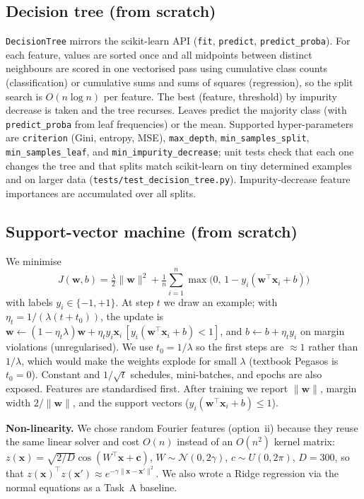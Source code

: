 \documentclass[10pt,twocolumn,a4paper]{article}
\begin{document}
\subsection{Decision tree (from scratch)}
\texttt{DecisionTree} mirrors the scikit-learn API (\texttt{fit}, \texttt{predict},
\texttt{predict\_proba}). For each feature, values are sorted once and all midpoints
between distinct neighbours are scored in one vectorised pass using cumulative class
counts (classification) or cumulative sums and sums of squares (regression), so
the split search is $O(n\log n)$ per feature. The best (feature, threshold) by
impurity decrease is taken and the tree recurses. Leaves predict the majority class
(with \texttt{predict\_proba} from leaf frequencies) or the mean. Supported
hyper-parameters are \texttt{criterion} (Gini, entropy, MSE), \texttt{max\_depth},
\texttt{min\_samples\_split}, \texttt{min\_samples\_leaf}, and
\texttt{min\_impurity\_decrease}; unit tests check that each one changes the tree and
that splits match scikit-learn on tiny determined examples and on larger data
(\texttt{tests/test\_decision\_tree.py}). Impurity-decrease feature importances
are accumulated over all splits.

\subsection{Support-vector machine (from scratch)}
We minimise
\begin{equation}
  J(\mathbf{w},b)=\tfrac{\lambda}{2}\lVert\mathbf{w}\rVert^{2}
  +\tfrac{1}{n}\sum_{i=1}^{n}\max\!\big(0,\,1-y_i(\mathbf{w}^{\top}\mathbf{x}_i+b)\big)
\end{equation}
with labels $y_i\in\{-1,+1\}$. At step $t$ we draw an example; with
$\eta_t=1/(\lambda(t+t_0))$, the update is
$\mathbf{w}\leftarrow(1-\eta_t\lambda)\mathbf{w}+\eta_t y_i\mathbf{x}_i\,[y_i(\mathbf{w}^\top\mathbf{x}_i+b)<1]$,
and $b\leftarrow b+\eta_t y_i$ on margin violations (unregularised).
We use $t_0=1/\lambda$ so the first steps are $\approx1$ rather than $1/\lambda$,
which would make the weights explode for small $\lambda$ (textbook Pegasos is
$t_0=0$). Constant and $1/\sqrt{t}$ schedules, mini-batches, and epochs are also
exposed. Features are standardised first. After training we report
$\lVert\mathbf{w}\rVert$, margin width $2/\lVert\mathbf{w}\rVert$, and the support
vectors ($y_i(\mathbf{w}^\top\mathbf{x}_i+b)\le1$).

\textbf{Non-linearity.} We chose random Fourier features
(option~ii) because they reuse the same linear solver and cost $O(n)$ instead of an
$O(n^2)$ kernel matrix: $z(\mathbf{x})=\sqrt{2/D}\cos(W^\top\mathbf{x}+\mathbf{c})$,
$W\!\sim\!\mathcal N(0,2\gamma)$, $c\!\sim\!U(0,2\pi)$, $D=300$, so that
$z(\mathbf{x})^\top z(\mathbf{x}')\approx e^{-\gamma\lVert\mathbf{x}-\mathbf{x}'\rVert^2}$.
We also wrote a Ridge regression via the normal equations as a Task~A baseline.
\end{document}
